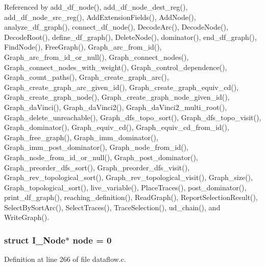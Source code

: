 Referenced by add\_\-df\_\-node(), add\_\-df\_\-node\_\-dest\_\-reg(), add\_\-df\_\-node\_\-src\_\-reg(), Add\-Extension\-Fields(), Add\-Node(), analyze\_\-df\_\-graph(), connect\_\-df\_\-node(), Decode\-Arc(), Decode\-Node(), Decode\-Root(), define\_\-df\_\-graph(), Delete\-Node(), dominator(), end\_\-df\_\-graph(), Find\-Node(), Free\-Graph(), Graph\_\-arc\_\-from\_\-id(), Graph\_\-arc\_\-from\_\-id\_\-or\_\-null(), Graph\_\-connect\_\-nodes(), Graph\_\-connect\_\-nodes\_\-with\_\-weight(), Graph\_\-control\_\-dependence(), Graph\_\-count\_\-paths(), Graph\_\-create\_\-graph\_\-arc(), Graph\_\-create\_\-graph\_\-arc\_\-given\_\-id(), Graph\_\-create\_\-graph\_\-equiv\_\-cd(), Graph\_\-create\_\-graph\_\-node(), Graph\_\-create\_\-graph\_\-node\_\-given\_\-id(), Graph\_\-da\-Vinci(), Graph\_\-da\-Vinci2(), Graph\_\-da\-Vinci2\_\-multi\_\-root(), Graph\_\-delete\_\-unreachable(), Graph\_\-dfs\_\-topo\_\-sort(), Graph\_\-dfs\_\-topo\_\-visit(), Graph\_\-dominator(), Graph\_\-equiv\_\-cd(), Graph\_\-equiv\_\-cd\_\-from\_\-id(), Graph\_\-free\_\-graph(), Graph\_\-imm\_\-dominator(), Graph\_\-imm\_\-post\_\-dominator(), Graph\_\-node\_\-from\_\-id(), Graph\_\-node\_\-from\_\-id\_\-or\_\-null(), Graph\_\-post\_\-dominator(), Graph\_\-preorder\_\-dfs\_\-sort(), Graph\_\-preorder\_\-dfs\_\-visit(), Graph\_\-rev\_\-topological\_\-sort(), Graph\_\-rev\_\-topological\_\-visit(), Graph\_\-size(), Graph\_\-topological\_\-sort(), live\_\-variable(), Place\-Traces(), post\_\-dominator(), print\_\-df\_\-graph(), reaching\_\-definition(), Read\-Graph(), Report\-Selection\-Result(), Select\-By\-Sort\-Arc(), Select\-Traces(), Trace\-Selection(), ud\_\-chain(), and Write\-Graph().
\subsubsection{\setlength{\rightskip}{0pt plus 5cm}struct \bf{I\_\-Node}$\ast$ \bf{node} = 0\hspace{0.3cm}{\tt  [static]}}\label{dataflow_8c_69971143e908d3fc31e596632d5a4073}




Definition at line 266 of file dataflow.c.

